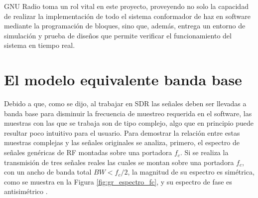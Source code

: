 GNU Radio toma un rol vital en este proyecto, proveyendo no solo la capacidad de realizar la implementación de todo el sistema conformador de haz en software mediante la programación de bloques, sino que, además, entrega un entorno de simulación y prueba de diseños que permite verificar el funcionamiento del sistema en tiempo real.

\section{El modelo equivalente banda base}
Debido a que, como se dijo, al trabajar en SDR las señales deben ser llevadas a banda base para disminuir la frecuencia de muestreo requerida en el software, las muestras con las que se trabaja son de tipo complejo, algo que en principio puede resultar poco intuitivo para el usuario. Para demostrar la relación entre estas muestras complejas y las señales originales se analiza, primero, el espectro de señales genéricas de RF montadas sobre una portadora $f_c$. Si se realiza la transmisión de tres señales reales las cuales se montan sobre una portadora $f_c$, con un ancho de banda total $BW<f_c/2$, la magnitud de su espectro es simétrica, como se muestra en la Figura \ref{fig:gr_espectro_fc}, y su espectro de fase es antisimétrico \cite{bib:haykin}.
